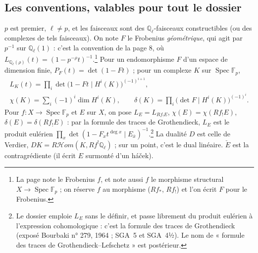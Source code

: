 \documentclass[11pt,a4paper]{article}
\begin{document}
\subsection*{Les conventions, valables pour tout le dossier}

$p$ est premier, $\ell \neq p$, et les faisceaux sont des
$\mathbb{Q}_\ell$-faisceaux constructibles (ou des complexes de tels
faisceaux). On note $F$ le Frobenius \emph{géométrique}, qui agit par $p^{-1}$
sur $\mathbb{Q}_\ell(1)$ : c'est la convention de la page 8, où
$L_{\mathbb{Q}_\ell(\rho)}(t) = (1 - p^{-\rho}t)^{-1}$.\footnote{La page note
le Frobenius $f$, et note aussi $f$ le morphisme structural
$X \to \operatorname{Spec}\mathbb{F}_p$ ; on réserve $f$ au morphisme
($Rf_{*}$, $Rf_{!}$) et l'on écrit $F$ pour le Frobenius.} Pour un
endomorphisme $F$ d'un espace de dimension finie,
$P_F(t) = \det(1 - Ft)$ ; pour un complexe $K$ sur
$\operatorname{Spec}\mathbb{F}_p$,
\[
  \begin{gathered}
  L_K(t) = \prod_i \det\bigl(1 - Ft \mid H^i(K)\bigr)^{(-1)^{i+1}},\\
  \chi(K) = \sum_i (-1)^i \dim H^i(K),\qquad
  \delta(K) = \prod_i \bigl(\det F \mid H^i(K)\bigr)^{(-1)^i}.
  \end{gathered}
\]
Pour $f : X \to \operatorname{Spec}\mathbb{F}_p$ et $E$ sur $X$, on pose
$L_E = L_{Rf_{!}E}$, $\chi(E) = \chi(Rf_{!}E)$, $\delta(E) = \delta(Rf_{!}E)$
: par la formule des traces de Grothendieck, $L_E$ est le produit eulérien
$\prod_x \det(1 - F_x t^{\deg x} \mid E_{\bar x})^{-1}$.\footnote{Le dossier
emploie $L_E$ sans le définir, et passe librement du produit eulérien à
l'expression cohomologique : c'est la formule des traces de Grothendieck
(exposé Bourbaki n° 279, 1964 ; SGA~5 et SGA~4½). Le nom de « formule des
traces de Grothendieck--Lefschetz » est postérieur.} La dualité $D$ est celle
de Verdier, $DK = R\mathcal{H}om(K, Rf^{!}\mathbb{Q}_\ell)$ ; sur un point,
c'est le dual linéaire. $\check E$ est la contragrédiente (il écrit $E$ surmonté
d'un háček).
\end{document}
